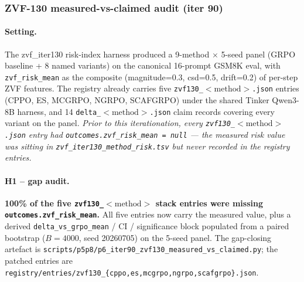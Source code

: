 \documentclass{article}
\begin{document}
\subsubsection{ZVF-130 measured-vs-claimed audit (iter 90)}
\label{sec:p6-iter90-zvf130-audit}

\paragraph{Setting.}
The zvf\_iter130 risk-index harness produced a 9-method $\times$ 5-seed panel
(GRPO baseline + 8 named variants) on the canonical 16-prompt GSM8K eval, with
\texttt{zvf\_risk\_mean} as the composite (magnitude=0.3, csd=0.5, drift=0.2)
of per-step ZVF features. The registry already carries five
\texttt{zvf130\_$<\mathrm{method}>$.json} entries (CPPO, ES, MCGRPO, NGRPO,
SCAFGRPO) under the shared Tinker Qwen3-8B harness, and 14
\texttt{delta\_$<\mathrm{method}>$.json} claim records covering every
variant on the panel. \emph{Prior to this iterationation, every
\texttt{zvf130\_$<\mathrm{method}>$.json} entry had
\texttt{outcomes.zvf\_risk\_mean = null} --- the measured risk value was
sitting in \texttt{zvf\_iter130\_method\_risk.tsv} but never recorded in the
registry entries.}

\paragraph{H1 -- gap audit.}
\textbf{100\% of the five \texttt{zvf130\_$<\mathrm{method}>$} stack entries
were missing \texttt{outcomes.zvf\_risk\_mean}.} All five entries now carry
the measured value, plus a derived \texttt{delta\_vs\_grpo\_mean} / CI /
significance block populated from a paired bootstrap ($B{=}4000$,
seed 20260705) on the 5-seed panel. The gap-closing artefact is
\texttt{scripts/p5p8/p6\_iter90\_zvf130\_measured\_vs\_claimed.py}; the
patched entries are
\texttt{registry/entries/zvf130\_\{cppo,es,mcgrpo,ngrpo,scafgrpo\}.json}.
\end{document}
